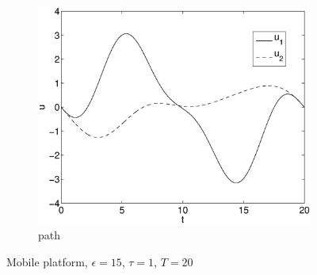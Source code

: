 \begin{figure}[h]
\begin{subfigure}[b]{\textwidth}
\centering
\includegraphics[height=0.3\textheight]{img/final_15_1_20_u.eps}
\caption{path}
\end{subfigure}
\caption{Mobile platform, $\epsilon=15$, $\tau=1$, $T=20$}
\label{fig:pl2}
\end{figure}


